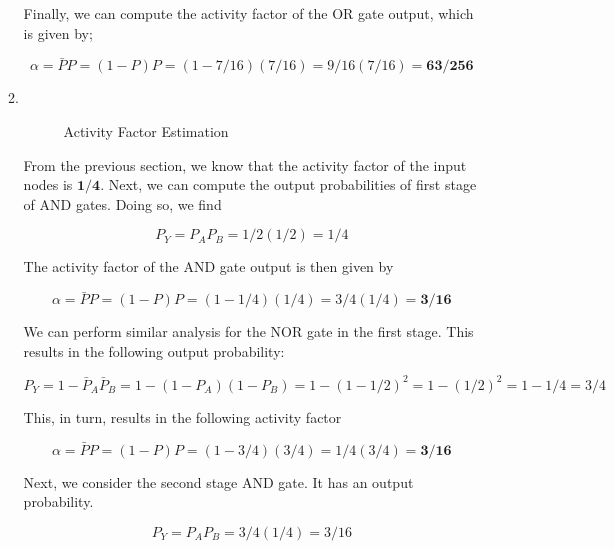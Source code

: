 \documentclass[fleqn]{article}
\begin{document}
\begin{enumerate}
\begin{enumerate}
			Finally, we can compute the activity factor of the OR gate output, which is given by;
			
			\begin{equation*}
				\alpha = \bar{P}P = (1 - P)P = (1 - 7/16)(7/16) = 9/16(7/16) = \mathbf{63/256}
			\end{equation*}
			
			\item ~
			
			\begin{figure}[H]				
				\centerline{}
				\caption{Activity Factor Estimation}
				\label{fig::activity_factor_b}
			\end{figure}
			
			From the previous section, we know that the activity factor of the input nodes is $\mathbf{1/4}$. Next, we can compute the output probabilities of first stage of AND gates. Doing so, we find
			
			\begin{equation*}
				P_Y = P_AP_B = 1/2(1/2) = 1/4
			\end{equation*}
			
			The activity factor of the AND gate output is then given by
			
			\begin{equation*}
				\alpha = \bar{P}P = (1 - P)P = (1 - 1/4)(1/4) = 3/4(1/4) = \mathbf{3/16}
			\end{equation*}
			
			We can perform similar analysis for the NOR gate in the first stage. This results in the following output probability:
			
			\begin{equation*}
				P_Y = 1 - \bar{P}_A\bar{P}_B = 1 - (1 - P_A)(1 - P_B) = 1 - (1 - 1/2)^2 = 1 - (1/2)^2 = 1 - 1/4 = 3/4
			\end{equation*}
			
			This, in turn, results in the following activity factor
			
			\begin{equation*}
				\alpha = \bar{P}P = (1 - P)P = (1 - 3/4)(3/4) = 1/4(3/4) = \mathbf{3/16}
			\end{equation*}
			
			Next, we consider the second stage AND gate. It has an output probability.
			
			\begin{equation*}
				P_Y = P_AP_B = 3/4(1/4) = 3/16
			\end{equation*}
			

\end{enumerate}
\end{enumerate}
\end{document}
